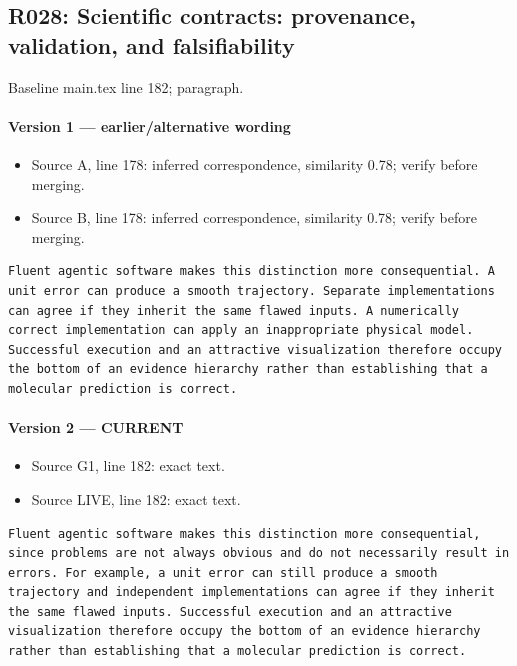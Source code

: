 \documentclass[11pt]{article}
\begin{document}
\subsection{R028: Scientific contracts: provenance, validation, and falsifiability}

Baseline main.tex line 182; paragraph.

\paragraph{Version 1 --- earlier/alternative wording}

\begin{itemize}[leftmargin=*]
\item Source A, line 178: inferred correspondence, similarity 0.78; verify before merging.
\item Source B, line 178: inferred correspondence, similarity 0.78; verify before merging.
\end{itemize}

\begin{lstlisting}
Fluent agentic software makes this distinction more consequential. A unit error can produce a smooth trajectory. Separate implementations can agree if they inherit the same flawed inputs. A numerically correct implementation can apply an inappropriate physical model. Successful execution and an attractive visualization therefore occupy the bottom of an evidence hierarchy rather than establishing that a molecular prediction is correct.
\end{lstlisting}

\paragraph{Version 2 --- CURRENT}

\begin{itemize}[leftmargin=*]
\item Source G1, line 182: exact text.
\item Source LIVE, line 182: exact text.
\end{itemize}

\begin{lstlisting}
Fluent agentic software makes this distinction more consequential, since problems are not always obvious and do not necessarily result in errors. For example, a unit error can still produce a smooth trajectory and independent implementations can agree if they inherit the same flawed inputs. Successful execution and an attractive visualization therefore occupy the bottom of an evidence hierarchy rather than establishing that a molecular prediction is correct.
\end{lstlisting}
\end{document}
